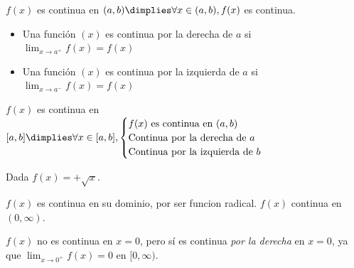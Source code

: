 \begin{defn}
	$f(x)$ es continua en $(a,b) \dimplies \forall x\in(a,b), f(x)$ es continua.
\end{defn}


\begin{defn}
	\begin{itemize}
		\item Una función $(x)$ es continua por la derecha de $a$ si $\displaystyle\lim_{x\to a^+}f(x) = f(x)$
		\item Una función $(x)$ es continua por la izquierda de $a$ si $\displaystyle\lim_{x\to a^-}f(x) = f(x)$
	\end{itemize}
\end{defn}

\begin{defn}
$f(x)$ es continua en $[a,b] \dimplies \forall x\in[a,b],\begin{cases} f(x) \text{ es continua en } (a,b)\\
\text{Continua por la derecha de } a\\
\text{Continua por la izquierda de } b\\\end{cases}$
\end{defn}


\begin{example}
Dada $f(x) = +\sqrt{x}$.

$f(x)$ es continua en su dominio, por ser funcion radical. $f(x)$ continua en $(0,\infty)$.

$f(x)$ no es continua en $x=0$, pero sí es continua \textit{por la derecha} en $x=0$, ya que $\displaystyle\lim_{x\to 0^+} f(x) = 0$ en $[0,\infty)$.
\end{example}


